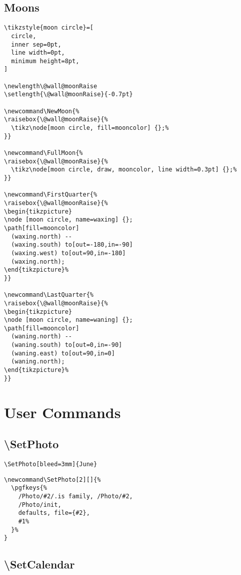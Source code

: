 \documentclass[11pt,oneside]{memoir-article}
\begin{document}
\section{Moons}
\label{sec-8-2}

\begin{verbatim}
\tikzstyle{moon circle}=[
  circle,
  inner sep=0pt,
  line width=0pt,
  minimum height=8pt,
]

\newlength\@wall@moonRaise
\setlength{\@wall@moonRaise}{-0.7pt}

\newcommand\NewMoon{%
\raisebox{\@wall@moonRaise}{%
  \tikz\node[moon circle, fill=mooncolor] {};%
}}

\newcommand\FullMoon{%
\raisebox{\@wall@moonRaise}{%
  \tikz\node[moon circle, draw, mooncolor, line width=0.3pt] {};%
}}

\newcommand\FirstQuarter{%
\raisebox{\@wall@moonRaise}{%
\begin{tikzpicture}
\node [moon circle, name=waxing] {};
\path[fill=mooncolor]
  (waxing.north) --
  (waxing.south) to[out=-180,in=-90]
  (waxing.west) to[out=90,in=-180]
  (waxing.north);
\end{tikzpicture}%
}}

\newcommand\LastQuarter{%
\raisebox{\@wall@moonRaise}{%
\begin{tikzpicture}
\node [moon circle, name=waning] {};
\path[fill=mooncolor]
  (waning.north) --
  (waning.south) to[out=0,in=-90]
  (waning.east) to[out=90,in=0]
  (waning.north);
\end{tikzpicture}%
}}
\end{verbatim}

\chapter{User Commands}
\label{sec-9}
\section{\textbackslash SetPhoto}
\label{sec-9-1}

\begin{verbatim}
\SetPhoto[bleed=3mm]{June}
\end{verbatim}

\begin{verbatim}
\newcommand\SetPhoto[2][]{%
  \pgfkeys{%
    /Photo/#2/.is family, /Photo/#2,
    /Photo/init,
    defaults, file={#2},
    #1%
  }%
}
\end{verbatim}

\section{\textbackslash SetCalendar}
\label{sec-9-2}
\end{document}
